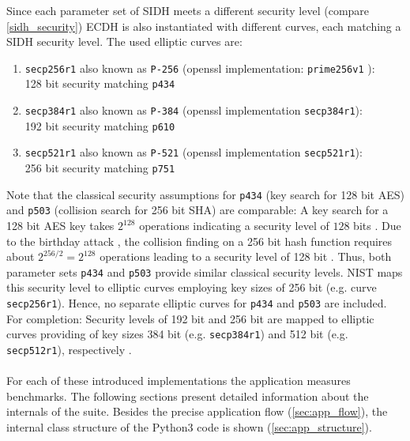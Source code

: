 Since each parameter set of \gls{SIDH} meets a different security level (compare \autoref{sidh_security}) \gls{ECDH} is also instantiated with different curves, each matching a \gls{SIDH} security level. The used elliptic curves are:
\begin{enumerate}
\item \texttt{secp256r1} also known as \texttt{P-256} (\gls{openssl} implementation: \texttt{prime256v1} \parencite{turner2009elliptic}): \\128 bit security matching \texttt{p434} \parencite{brown2010sec}
\item \texttt{secp384r1} also known as \texttt{P-384} (\gls{openssl} implementation \texttt{secp384r1}): \\192 bit security matching \texttt{p610} \parencite{brown2010sec}
\item \texttt{secp521r1} also known as \texttt{P-521} (\gls{openssl} implementation \texttt{secp521r1}): \\256 bit security  matching \texttt{p751} \parencite{brown2010sec}
\end{enumerate}

Note that the classical security assumptions for \texttt{p434} (key search for 128 bit AES) and \texttt{p503} (collision search for 256 bit SHA) are comparable: A key search for a 128 bit AES key takes $2^{128}$ operations indicating a security level of $128$ bits \parencite{lenstra2006key}. Due to the birthday attack \parencite{gupta2015birthday}, the collision finding on a 256 bit hash function requires about $2^{256/2} = 2^{128}$ operations leading to a security level of 128 bit \parencite{lenstra2006key}. Thus, both parameter sets \texttt{p434} and \texttt{p503} provide similar classical security levels. NIST maps this security level to elliptic curves employing key sizes of 256 bit (e.g. curve \texttt{secp256r1}). Hence, no separate elliptic curves for \texttt{p434} and \texttt{p503} are included. For completion: Security levels of 192 bit and 256 bit are mapped to elliptic curves providing of key sizes 384 bit (e.g.  \texttt{secp384r1}) and 512 bit (e.g.  \texttt{secp512r1}), respectively \parencite{barker2016recommendation}. 
\\\\
For each of these introduced implementations the application measures benchmarks. The following sections present detailed information about the internals of the suite. Besides the precise application flow (\autoref{sec:app_flow}), the internal class structure of the Python3 code is shown (\autoref{sec:app_structure}).

